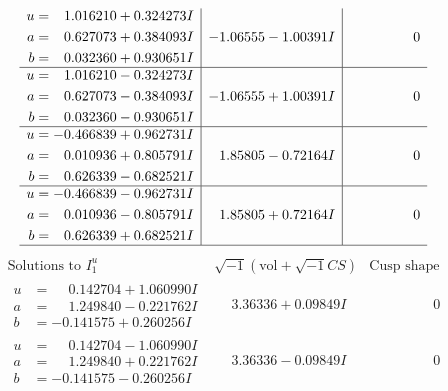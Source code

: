 \documentclass[1p]{elsarticle_modified}
\theoremstyle{definition}
\newcommand{\I}{\sqrt{-1}}
\begin{document}
$$\begin{array}{c|c|c}
\begin{aligned}
u &= \phantom{-}1.016210 + 0.324273 I \\
a &= \phantom{-}0.627073 + 0.384093 I \\
b &= \phantom{-}0.032360 + 0.930651 I\end{aligned}
 & -1.06555 - 1.00391 I & \phantom{-0.000000 } 0 \\ \hline\begin{aligned}
u &= \phantom{-}1.016210 - 0.324273 I \\
a &= \phantom{-}0.627073 - 0.384093 I \\
b &= \phantom{-}0.032360 - 0.930651 I\end{aligned}
 & -1.06555 + 1.00391 I & \phantom{-0.000000 } 0 \\ \hline\begin{aligned}
u &= -0.466839 + 0.962731 I \\
a &= \phantom{-}0.010936 + 0.805791 I \\
b &= \phantom{-}0.626339 - 0.682521 I\end{aligned}
 & \phantom{-}1.85805 - 0.72164 I & \phantom{-0.000000 } 0 \\ \hline\begin{aligned}
u &= -0.466839 - 0.962731 I \\
a &= \phantom{-}0.010936 - 0.805791 I \\
b &= \phantom{-}0.626339 + 0.682521 I\end{aligned}
 & \phantom{-}1.85805 + 0.72164 I & \phantom{-0.000000 } 0\\
 \hline 
 \end{array}$$\newpage$$\begin{array}{c|c|c}  
\text{Solutions to }I^u_{1}& \I (\text{vol} + \sqrt{-1}CS) & \text{Cusp shape}\\
 \hline 
\begin{aligned}
u &= \phantom{-}0.142704 + 1.060990 I \\
a &= \phantom{-}1.249840 - 0.221762 I \\
b &= -0.141575 + 0.260256 I\end{aligned}
 & \phantom{-}3.36336 + 0.09849 I & \phantom{-0.000000 } 0 \\ \hline\begin{aligned}
u &= \phantom{-}0.142704 - 1.060990 I \\
a &= \phantom{-}1.249840 + 0.221762 I \\
b &= -0.141575 - 0.260256 I\end{aligned}
 & \phantom{-}3.36336 - 0.09849 I & \phantom{-0.000000 } 0 \\ \hline\begin{aligned}

\end{aligned}
\end{array}$$
\end{document}
